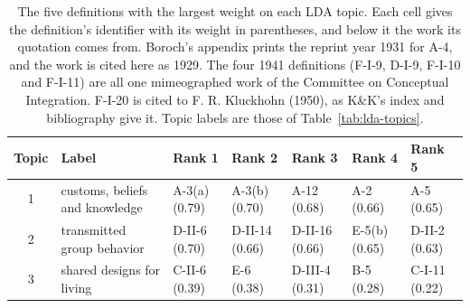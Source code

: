 \documentclass[11pt]{article}
\begin{document}
\begin{table}[t]
\centering
\caption{The five definitions with the largest weight on each LDA topic. Each cell gives the definition's identifier with its weight in parentheses, and below it the work its quotation comes from. Boroch's appendix prints the reprint year 1931 for A-4, and the work is cited here as 1929. The four 1941 definitions (F-I-9, D-I-9, F-I-10 and F-I-11) are all one mimeographed work of the Committee on Conceptual Integration. F-I-20 is cited to F. R. Kluckhohn (1950), as K\&K's index and bibliography give it. Topic labels are those of Table~\ref{tab:lda-topics}.}
\label{tab:lda-top-definitions}
\footnotesize
\setlength{\tabcolsep}{3pt}
\begin{tabular}{c>{\raggedright\arraybackslash}p{2.6cm}>{\raggedright\arraybackslash}p{2.2cm}>{\raggedright\arraybackslash}p{2.2cm}>{\raggedright\arraybackslash}p{2.2cm}>{\raggedright\arraybackslash}p{2.2cm}>{\raggedright\arraybackslash}p{2.2cm}}
\toprule
Topic & Label & Rank 1 & Rank 2 & Rank 3 & Rank 4 & Rank 5 \\
\midrule
1 & customs, beliefs and knowledge & A-3(a) (0.79) \newline \citealt{dixon1928} & A-3(b) (0.70) \newline \citealt{dixon1928} & A-12 (0.68) \newline \citealt{murray1943} & A-2 (0.66) \newline \citealt{wissler1920} & A-5 (0.65) \newline \citealt{burkitt1929} \\
2 & transmitted group behavior & D-II-6 (0.70) \newline \citealt{benedict1947} & D-II-14 (0.66) \newline \citealt{steward1950} & D-II-16 (0.66) \newline \citealt{aberle1950} & E-5(b) (0.65) \newline \citealt{linton1945a} & D-II-2 (0.63) \newline \citealt{hartpantzer1925} \\
3 & shared designs for living & C-II-6 (0.39) \newline \citealt{sorokin1947} & E-6 (0.38) \newline \citealt{kluckhohnkelly1945a} & D-III-4 (0.31) \newline \citealt{roberts1951} & B-5 (0.28) \newline \citealt{bose1929} & C-I-11 (0.22) \newline \citealt{kluckhohnkelly1945a} \\

\end{tabular}
\end{table}
\end{document}
